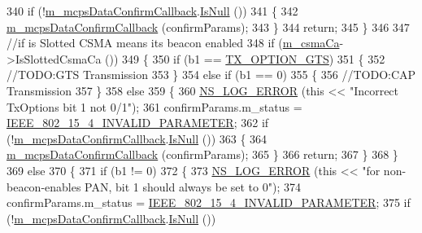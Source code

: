 \begin{DoxyCode}
340       \textcolor{keywordflow}{if} (!\hyperlink{classns3_1_1LrWpanMac_a05eba7a98d1cbbf86151290069e093e0}{m\_mcpsDataConfirmCallback}.\hyperlink{classns3_1_1Callback_aa8e27826badbf37f84763f36f70d9b54}{IsNull} ())
341         \{
342           \hyperlink{classns3_1_1LrWpanMac_a05eba7a98d1cbbf86151290069e093e0}{m\_mcpsDataConfirmCallback} (confirmParams);
343         \}
344       \textcolor{keywordflow}{return};
345     \}
346 
347   \textcolor{comment}{//if is Slotted CSMA means its beacon enabled}
348   \textcolor{keywordflow}{if} (\hyperlink{classns3_1_1LrWpanMac_a03fc5a3a267a984f8ec0ba62ff9da270}{m\_csmaCa}->IsSlottedCsmaCa ())
349     \{
350       \textcolor{keywordflow}{if} (b1 == \hyperlink{group__lr-wpan_gga74ea891230ebf45d80d69a67266930a4a92b73ac4060ce7bc7ed5cf614cd48bfc}{TX\_OPTION\_GTS})
351         \{
352           \textcolor{comment}{//TODO:GTS Transmission}
353         \}
354       \textcolor{keywordflow}{else} \textcolor{keywordflow}{if} (b1 == 0)
355         \{
356           \textcolor{comment}{//TODO:CAP Transmission}
357         \}
358       \textcolor{keywordflow}{else}
359         \{
360           \hyperlink{group__logging_ga0261a8db1d4ac5f79417d117634fd455}{NS\_LOG\_ERROR} (\textcolor{keyword}{this} << \textcolor{stringliteral}{"Incorrect TxOptions bit 1 not 0/1"});
361           confirmParams.m\_status = \hyperlink{group__lr-wpan_gga50d67c8816b2ca8da8df30d045b1b705a5c8b06d425e18155370ce481538e74de}{IEEE\_802\_15\_4\_INVALID\_PARAMETER};
362           \textcolor{keywordflow}{if} (!\hyperlink{classns3_1_1LrWpanMac_a05eba7a98d1cbbf86151290069e093e0}{m\_mcpsDataConfirmCallback}.\hyperlink{classns3_1_1Callback_aa8e27826badbf37f84763f36f70d9b54}{IsNull} ())
363             \{
364               \hyperlink{classns3_1_1LrWpanMac_a05eba7a98d1cbbf86151290069e093e0}{m\_mcpsDataConfirmCallback} (confirmParams);
365             \}
366           \textcolor{keywordflow}{return};
367         \}
368     \}
369   \textcolor{keywordflow}{else}
370     \{
371       \textcolor{keywordflow}{if} (b1 != 0)
372         \{
373           \hyperlink{group__logging_ga0261a8db1d4ac5f79417d117634fd455}{NS\_LOG\_ERROR} (\textcolor{keyword}{this} << \textcolor{stringliteral}{"for non-beacon-enables PAN, bit 1 should always be set to 0"});
374           confirmParams.m\_status = \hyperlink{group__lr-wpan_gga50d67c8816b2ca8da8df30d045b1b705a5c8b06d425e18155370ce481538e74de}{IEEE\_802\_15\_4\_INVALID\_PARAMETER};
375           \textcolor{keywordflow}{if} (!\hyperlink{classns3_1_1LrWpanMac_a05eba7a98d1cbbf86151290069e093e0}{m\_mcpsDataConfirmCallback}.\hyperlink{classns3_1_1Callback_aa8e27826badbf37f84763f36f70d9b54}{IsNull} ())

\end{DoxyCode}
